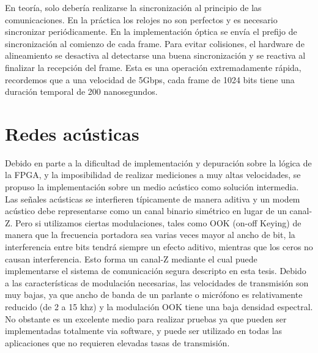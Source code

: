 En teoría, solo debería realizarse la sincronización al principio de las comunicaciones. En la práctica los relojes no son perfectos y es necesario sincronizar periódicamente. En la implementación óptica se envía el prefijo de sincronización al comienzo de cada frame.
Para evitar colisiones, el hardware de alineamiento se desactiva al detectarse una buena sincronización y se reactiva al finalizar la recepción del frame. Esta es una operación extremadamente rápida, recordemos que a una velocidad de 5Gbps, cada frame de 1024 bits tiene una duración temporal de 200 nanosegundos.

\section{Redes acústicas}
\label{redacus}
Debido en parte a la dificultad de implementación y depuración sobre la lógica de la FPGA, y la imposibilidad de realizar mediciones a muy altas velocidades, se propuso la implementación sobre un medio acústico como solución intermedia. Las señales acústicas se interfieren típicamente de manera aditiva y un modem acústico debe representarse como un canal binario simétrico en lugar de un canal-Z. Pero si utilizamos ciertas modulaciones, tales como OOK (on-off Keying) de manera que la frecuencia portadora sea varias veces mayor al ancho de bit, la interferencia entre bits tendrá siempre un efecto aditivo, mientras que los ceros no causan interferencia. Esto forma un canal-Z mediante el cual puede implementarse el sistema de comunicación segura descripto en esta tesis. Debido a las características de modulación necesarias, las velocidades de transmisión son muy bajas, ya que ancho de banda de un parlante o micrófono es relativamente reducido (de 2 a 15 khz) y la modulación OOK tiene una baja densidad espectral. 
No obstante es un excelente medio para realizar pruebas ya que pueden ser implementadas totalmente via software, y puede ser utilizado en todas las aplicaciones que no requieren elevadas tasas de transmisión.

